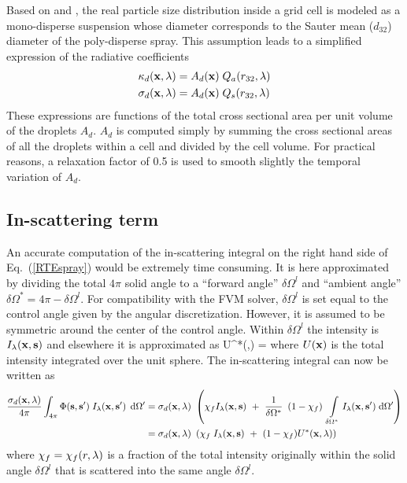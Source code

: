 Based on \cite{Collin} and \cite{Maruyama}, the real particle size distribution inside a grid cell is modeled as a mono-disperse suspension
whose diameter corresponds to the Sauter mean ($d_{32}$) diameter of the poly-disperse spray.
This assumption leads to a simplified expression of the radiative coefficients
\begin{align}
\kappa_d({\bf x},\lambda) &= A_d({\bf x}) \; Q_a(r_{32},\lambda) \\
\sigma_d({\bf x},\lambda) &= A_d({\bf x}) \; Q_s(r_{32},\lambda)
\end{align}
These expressions are functions of the total cross sectional area per unit volume of the droplets $A_d$. $A_d$ is computed simply by summing the cross sectional areas of all the droplets within a cell and divided by the cell volume. For practical reasons, a relaxation factor of 0.5 is
used to smooth slightly the temporal variation of $A_d$.

\subsection{In-scattering term}

An accurate computation of the in-scattering integral on the right
hand side of Eq.~(\ref{RTEspray}) would be extremely time
consuming. It is here approximated by dividing the total $4\pi$ solid
angle to a ``forward angle'' $\delta\Omega^l$ and ``ambient angle''
$\delta\Omega^*=4\pi - \delta\Omega^l$.  For compatibility with the
FVM solver, $\delta\Omega^l$ is set equal to the control angle given
by the angular discretization.  However, it is assumed to be symmetric
around the center of the control angle.  Within $\delta\Omega^l$ the
intensity is $I_{\lambda}({\bf x},{\bf s})$ and elsewhere it is approximated as
\be
U^*(\bx,\la) = 
\ee
where $U({\bf x})$ is the total intensity integrated over the unit sphere. The in-scattering
integral can now be written as
\begin{align}
\frac{\sigma_d({\bf x},\lambda)}{4\pi}\int_{4\pi}\Phi({\bf s},{\bf s}') \; I_{\lambda}({\bf x},{\bf s}')
  \; \,\mathrm{d}\Omega'
  &=
\sigma_d({\bf x},\lambda)~ \left( \chi_f I_{\lambda}({\bf x},{\bf s}) ~+~\frac{1}{\delta\Omega^{*}}~\left(1-\chi_f\right)~
\int\limits_{\delta\Omega^{*}} I_{\lambda}({\bf x},{\bf s}') \; \textrm{d} \Omega' \right)\\
  &=
\sigma_d({\bf x},\lambda)~ \left( \chi_f \; I_{\lambda}({\bf x},{\bf s}) ~+~
(1-\chi_f)U^*({\bf x},\lambda) \right)
\end{align}
where $\chi_f = \chi_f(r,\lambda)$ is a fraction of the total intensity
originally within the solid angle $\delta\Omega^l$ that is scattered
into the same angle $\delta\Omega^l$.

